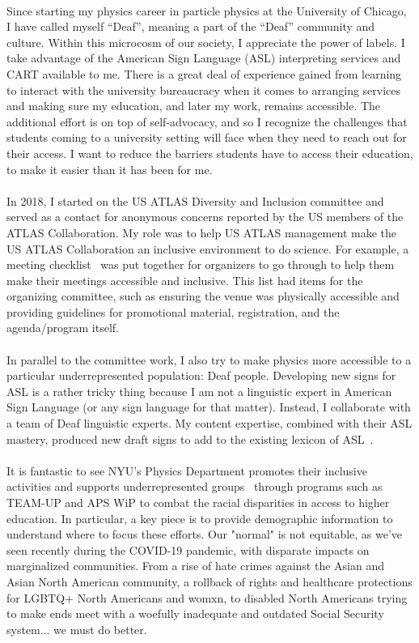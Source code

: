 \documentclass[10pt,a4paper,sans]{moderncv} %
\begin{document}
\\
Since starting my physics career in particle physics at the University of Chicago, I have called myself ``Deaf'', meaning a part of the ``Deaf'' community and culture. Within this microcosm of our society, I appreciate the power of labels. I take advantage of the American Sign Language (ASL) interpreting services and CART available to me. There is a great deal of experience gained from learning to interact with the university bureaucracy when it comes to arranging services and making sure my education, and later my work, remains accessible. The additional effort is on top of self-advocacy, and so I recognize the challenges that students coming to a university setting will face when they need to reach out for their access. I want to reduce the barriers students have to access their education, to make it easier than it has been for me.
\\
\\
In 2018, I started on the US ATLAS Diversity and Inclusion committee and served as a contact for anonymous concerns reported by the US members of the ATLAS Collaboration. My role was to help US ATLAS management make the US ATLAS Collaboration an inclusive environment to do science. For example, a meeting checklist~\cite{Assamagan:2022oka} was put together for organizers to go through to help them make their meetings accessible and inclusive. This list had items for the organizing committee, such as ensuring the venue was physically accessible and providing guidelines for promotional material, registration, and the agenda/program itself.
\\
\\
In parallel to the committee work, I also try to make physics more accessible to a particular underrepresented population: Deaf people. Developing new signs for ASL is a rather tricky thing because I am not a linguistic expert in American Sign Language (or any sign language for that matter). Instead, I collaborate with a team of Deaf linguistic experts. My content expertise, combined with their ASL mastery, produced new draft signs to add to the existing lexicon of ASL~\cite{ICPS2021, MatterInterpretation}.
\\
\\
It is fantastic to see NYU's Physics Department promotes their inclusive activities and supports underrepresented groups~\cite{diversitypage} through programs such as TEAM-UP and APS WiP to combat the racial disparities in access to higher education. In particular, a key piece is to provide demographic information to understand where to focus these efforts. Our "normal" is not equitable, as we've seen recently during the COVID-19 pandemic, with disparate impacts on marginalized communities. From a rise of hate crimes against the Asian and Asian North American community, a rollback of rights and healthcare protections for LGBTQ+ North Americans and womxn, to disabled North Americans trying to make ends meet with a woefully inadequate and outdated Social Security system... we must do better.
\end{document}
